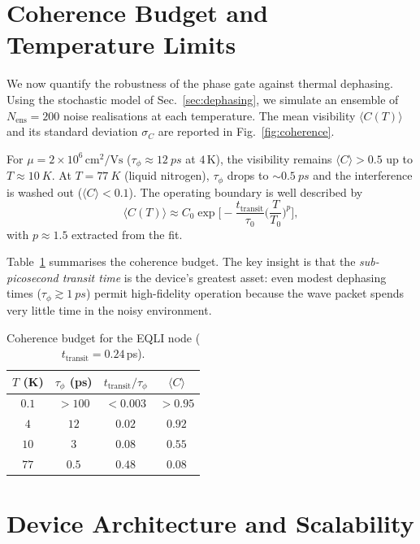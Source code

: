 \documentclass[11pt,a4paper]{article}
\newcommand{\expt}[1]{\langle#1\rangle}
\begin{document}
\section{Coherence Budget and Temperature Limits}
\label{sec:coherence}

We now quantify the robustness of the phase gate against thermal dephasing. 
Using the stochastic model of Sec.~\ref{sec:dephasing}, we simulate an 
ensemble of $N_{\text{ens}}=200$ noise realisations at each temperature. The 
mean visibility $\expt{C(T)}$ and its standard deviation $\sigma_C$ are 
reported in Fig.~\ref{fig:coherence}.

For $\mu=2\times10^6\,\text{cm}^2\text{/Vs}$ ($\tau_\phi\approx\SI{12}{ps}$ 
at $4\,$K), the visibility remains $\expt{C}>0.5$ up to $T\approx\SI{10}{K}$. 
At $T=\SI{77}{K}$ (liquid nitrogen), $\tau_\phi$ drops to $\sim\SI{0.5}{ps}$ 
and the interference is washed out ($\expt{C}<0.1$). The operating boundary 
is well described by
\begin{equation}
\expt{C(T)} \approx C_0\exp\!\Big[-\frac{t_{\text{transit}}}{\tau_0}
\Big(\frac{T}{T_0}\Big)^p\Big],
\label{eq:visibility}
\end{equation}
with $p\approx 1.5$ extracted from the fit.

Table~\ref{tab:coherence} summarises the coherence budget. The key insight is 
that the \emph{sub-picosecond transit time} is the device's greatest asset: 
even modest dephasing times ($\tau_\phi\gtrsim\SI{1}{ps}$) permit high-fidelity 
operation because the wave packet spends very little time in the noisy 
environment.

\begin{table}[t]
\centering
\caption{Coherence budget for the EQLI node ($t_{\text{transit}}=0.24\,$ps).}
\label{tab:coherence}
\begin{tabular}{@{}cccc@{}}
\toprule
$T$ (K) & $\tau_\phi$ (ps) & $t_{\text{transit}}/\tau_\phi$ & $\expt{C}$ \\
\midrule
$0.1$  & $>100$ & $<0.003$ & $>0.95$ \\
$4$    & $12$   & $0.02$   & $0.92$  \\
$10$   & $3$    & $0.08$   & $0.55$  \\
$77$   & $0.5$  & $0.48$   & $0.08$  \\
\bottomrule
\end{tabular}
\end{table}

\section{Device Architecture and Scalability}
\label{sec:device}
\end{document}
